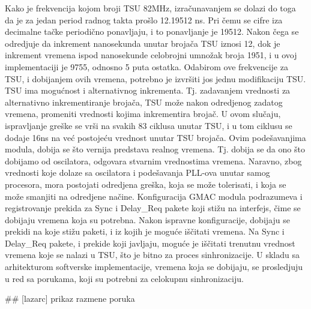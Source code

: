 \documentclass[a4paper,12pt, master]{etf}
\begin{document}
	Kako je frekvencija kojom broji TSU 82MHz, izra\v{c}unavanjem se dolazi do
	toga da je za jedan period radnog takta pro\v{s}lo 12.19512 ns. Pri \v{c}emu
    se cifre iza decimalne ta\v{c}ke periodi\v{c}no ponavljaju,  i to
    ponavljanje je 19512. Nakon \v{c}ega se odredjuje da inkrement nanosekunda
    unutar broja\v{c}a TSU iznosi 12, dok je inkrement vremena ispod nanosekunde
    celobrojni umno\v{z}ak broja 1951, i u ovoj implementaciji je 9755, odnosno
    5 puta ostatka. Odabirom ove frekvencije za TSU, i dobijanjem ovih vremena,
    potrebno je izvr\v{s}iti jos jednu modifikaciju TSU\@. TSU ima mogu\'{c}nost
    i alternativnog inkrementa. Tj\@. zadavanjem vrednosti za alternativno
    inkrementiranje broja\v{c}a, TSU mo\v{z}e nakon odredjenog zadatog vremena,
    promeniti vrednosti kojima inkrementira broja\v{c}. U ovom slu\v{c}aju,
    ispravljanje gre\v{s}ke se vr\v{s}i na svakih 83 ciklusa unutar TSU, i u tom
    ciklusu se dodaje 16ns na ve\'{c} postoje\'{c}u vrednost unutar TSU
    broja\v{c}a. Ovim pode\v{s}avanjima modula, dobija se \v{s}to vernija
    predstava realnog vremena. Tj\@. dobija se da ono \v{s}to dobijamo od
    oscilatora, odgovara stvarnim vrednostima vremena. Naravno, zbog vrednosti
    koje dolaze sa oscilatora i pode\v{s}avanja PLL-ova unutar samog procesora,
    mora postojati odredjena gre\v{s}ka, koja se mo\v{z}e tolerisati, i koja se
    mo\v{z}e smanjiti na odredjene na\v{c}ine. Konfiguracija GMAC modula
    podrazumeva i registrovanje prekida za Sync i Delay\_Req pakete koji
    sti\v{z}u na interfejs, \v{c}ime se dobijaju vremena koja su potrebna. Nakon
    ispravne konfiguracije, dobijaju se prekidi na koje sti\v{z}u paketi, i iz
    kojih je mogu\'{c}e i\v{s}\v{c}itati vremena. Na Sync i Delay\_Req pakete,
    i prekide koji javljaju, mogu\'{c}e je i\v{s}\v{c}itati trenutnu vrednost
    vremena koje se nalazi u TSU, \v{s}to je bitno za proces sinhronizacije. U
    skladu sa arhitekturom softverske implementacije, vremena koja se dobijaju,
    se prosledjuju u red sa porukama, koji su potrebni za celokupnu
    sinhronizaciju.

	\#\# [lazarc] prikaz razmene poruka
\end{document}
